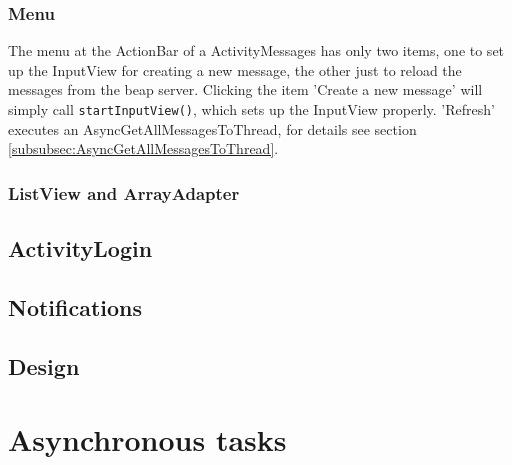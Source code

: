 \documentclass[12pt,a4paper,oneside]{report}
\newcommand{\code}[1]{\lstinline{#1}}
\begin{document}
\subsubsection{Menu}
The menu at the ActionBar of a ActivityMessages has only two items, one to set up the InputView for creating a new message, the other just to reload the messages from the beap server. Clicking the item 'Create a new message' will simply call \code{startInputView()}, which sets up the InputView properly. 'Refresh' executes an AsyncGetAllMessagesToThread, for details see section  \ref{subsubsec:AsyncGetAllMessagesToThread}.

\subsubsection{ListView and ArrayAdapter}

\subsection{ActivityLogin}

\subsection{Notifications}

\subsection{Design}

\section{Asynchronous tasks}
\end{document}
